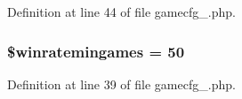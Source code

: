 Definition at line 44 of file gamecfg\+\_.\+php.

\hypertarget{gamecfg__1_8php_a5154e0cf72d44a6cd3a3974dbd05bcf9}{
\subsubsection[{\$winratemingames}]{\setlength{\rightskip}{0pt plus 5cm}\$winratemingames = 50}}\label{gamecfg__1_8php_a5154e0cf72d44a6cd3a3974dbd05bcf9}


Definition at line 39 of file gamecfg\+\_.\+php.

